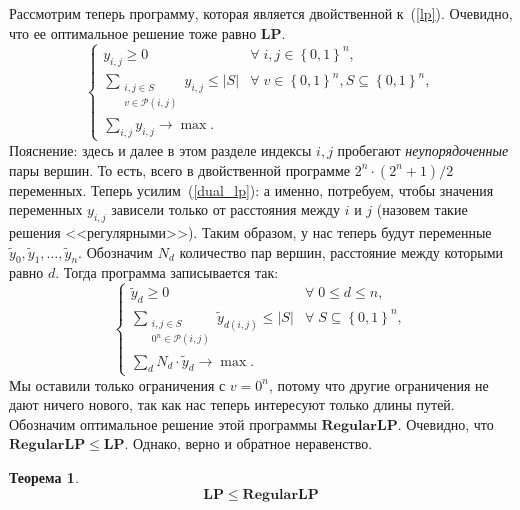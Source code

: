 \documentclass[12pt]{article}
\newcommand{\set}[1]{\left\{#1\right\}}
\newcommand{\abs}[1]{\left|#1\right|}
\newcommand{\zo}{\set{0, 1}}
\newcommand{\Pc}{\mathcal{P}}
\newtheorem{theorem}{Теорема}
\begin{document}
    Рассмотрим теперь программу, которая является двойственной к~(\ref{lp}).
    Очевидно, что ее оптимальное решение тоже равно $\mathbf{LP}$.
    \begin{equation}
        \label{dual_lp}
        \begin{cases}
            y_{i,j} \geq 0 & \forall \; i, j \in \zo^n, \\ 
            \sum_{\begin{smallmatrix}i, j \in S \\ v \in \Pc(i, j)\end{smallmatrix}} y_{i,j} \leq \abs{S} & \forall \; v \in \zo^n, S \subseteq \zo^n,  \\
            \sum_{i,j} y_{i,j} \to \max.
        \end{cases}
    \end{equation}
    Пояснение: здесь и далее в этом разделе индексы $i, j$ пробегают \emph{неупорядоченные} пары вершин. То есть,
    всего в двойственной программе $2^n \cdot (2^n + 1) / 2$ переменных.
    Теперь усилим~(\ref{dual_lp}): а именно, потребуем, чтобы значения переменных $y_{i,j}$ зависели только от расстояния между $i$ и $j$ (назовем такие
    решения <<регулярными>>).
    Таким образом, у нас теперь будут переменные $\tilde{y}_0, \tilde{y}_1, \ldots, \tilde{y}_n$.
    Обозначим $N_d$ количество пар вершин, расстояние между которыми равно $d$. Тогда программа записывается так:
    \begin{equation}
        \label{regular_dual_lp}
        \begin{cases}
            \tilde{y}_d \geq 0 & \forall \; 0 \leq d \leq n, \\
            \sum_{\begin{smallmatrix}i, j \in S \\ 0^n \in \Pc(i, j)\end{smallmatrix}} \tilde{y}_{d(i, j)} \leq \abs{S} & \forall \; S \subseteq \zo^n, \\
            \sum_{d} N_d \cdot \tilde{y}_d \to \max.
        \end{cases}
    \end{equation}
    Мы оставили только ограничения с $v = 0^n$, потому что другие ограничения не дают ничего нового, так как нас теперь интересуют только длины путей.
    Обозначим оптимальное решение этой программы $\mathbf{RegularLP}$.
    Очевидно, что $\mathbf{RegularLP} \leq \mathbf{LP}$.
    Однако, верно и обратное неравенство.
    \begin{theorem}
        $$
            \mathbf{LP} \leq \mathbf{RegularLP}
        $$
    \end{theorem}
\end{document}
